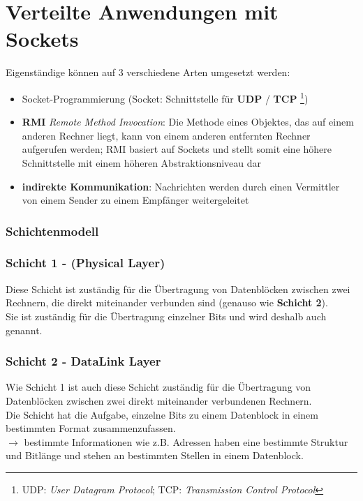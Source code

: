 \chapter{Verteilte Anwendungen mit Sockets}

Eigenständige  können auf 3 verschiedene Arten umgesetzt werden:

\begin{itemize}
    \item Socket-Programmierung (Socket: Schnittstelle für \textbf{UDP} / \textbf{TCP} \footnote{
    UDP: \textit{User Datagram Protocol}; TCP: \textit{Transmission Control Protocol}
    })
    \item \textbf{RMI} \textit{Remote Method Invocation}: Die Methode eines Objektes, das auf einem anderen Rechner liegt, kann von einem anderen entfernten Rechner aufgerufen werden; RMI basiert auf Sockets und stellt somit eine höhere Schnittstelle mit einem höheren Abstraktionsniveau dar
    \item \textbf{indirekte Kommunikation}: Nachrichten werden durch einen Vermittler von einem Sender zu einem Empfänger weitergeleitet
\end{itemize}


\subsection{Schichtenmodell}

\subsection*{Schicht 1 - (Physical Layer)}

Diese Schicht ist zuständig für die Übertragung von Datenblöcken zwischen zwei Rechnern, die direkt miteinander verbunden sind (genauso wie \textbf{Schicht 2}).\\
Sie ist zuständig für die Übertragung einzelner Bits und wird deshalb auch  genannt.

\subsection*{Schicht 2 - DataLink Layer}

Wie Schicht 1 ist auch diese Schicht zuständig für die Übertragung von Datenblöcken zwischen zwei direkt miteinander verbundenen Rechnern.\\

Die Schicht hat die Aufgabe, einzelne Bits zu einem Datenblock in einem bestimmten Format zusammenzufassen.\\
$\rightarrow$ bestimmte Informationen wie z.B. Adressen haben eine bestimmte Struktur und Bitlänge und stehen an bestimmten Stellen in einem Datenblock.\\

